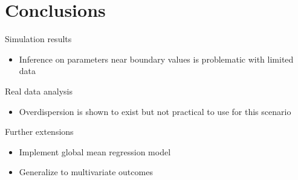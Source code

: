 \chapter{Conclusions}
\label{cap:concl}

Simulation results

\begin{itemize}
\item Inference on parameters near boundary values is problematic with limited data
\end{itemize}

Real data analysis

\begin{itemize}
\item Overdispersion is shown to exist but not practical to use for this scenario
\end{itemize}

Further extensions

\begin{itemize}
\item Implement global mean regression model
\item Generalize to multivariate outcomes
\end{itemize}